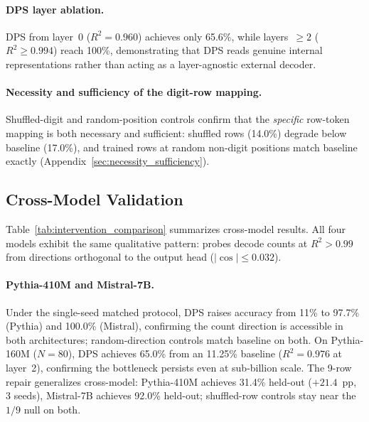 \documentclass{article}
\begin{document}
\paragraph{DPS layer ablation.}
DPS from layer~0 ($R^2{=}0.960$) achieves only 65.6\%, while layers~$\geq 2$
($R^2 \geq 0.994$) reach 100\%, demonstrating that DPS reads genuine internal
representations rather than acting as a layer-agnostic external decoder.

\paragraph{Necessity and sufficiency of the digit-row mapping.}
Shuffled-digit and random-position controls confirm that the \emph{specific} row-token
mapping is both necessary and sufficient: shuffled rows (14.0\%) degrade below baseline
(17.0\%), and trained rows at random non-digit positions match baseline exactly
(Appendix~\ref{sec:necessity_sufficiency}).

\subsection{Cross-Model Validation}
\label{sec:dps_pythia}

Table~\ref{tab:intervention_comparison} summarizes cross-model results.
All four models exhibit the same qualitative pattern: probes decode counts at
$R^2 > 0.99$ from directions orthogonal to the output head ($|\cos| \leq 0.032$).

\paragraph{Pythia-410M and Mistral-7B.}
Under the single-seed matched protocol, DPS raises accuracy from 11\% to 97.7\% (Pythia) and 100.0\% (Mistral), confirming the count direction is accessible in both architectures;
random-direction controls match baseline on both.
On Pythia-160M ($N=80$), DPS achieves 65.0\% from an 11.25\% baseline
($R^2=0.976$ at layer~2), confirming the bottleneck persists even at
sub-billion scale.
The 9-row repair generalizes cross-model: Pythia-410M achieves 31.4\% held-out
($+21.4$~pp, 3 seeds), Mistral-7B achieves 92.0\% held-out; shuffled-row controls
stay near the $1/9$ null on both.
\end{document}
